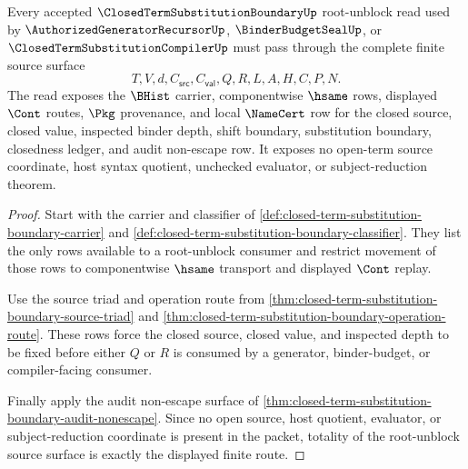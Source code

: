 \begin{theorem}
\label{thm:closed-term-substitution-boundary-source-totality}
Every accepted $\ClosedTermSubstitutionBoundaryUp$ root-unblock read used by $\AuthorizedGeneratorRecursorUp$, $\BinderBudgetSealUp$, or $\ClosedTermSubstitutionCompilerUp$ must pass through the complete finite source surface
$$
T,V,d,C_{\mathsf{src}},C_{\mathsf{val}},Q,R,L,A,H,C,P,N.
$$
The read exposes the $\BHist$ carrier, componentwise $\hsame$ rows, displayed $\Cont$ routes, $\Pkg$ provenance, and local $\NameCert$ row for the closed source, closed value, inspected binder depth, shift boundary, substitution boundary, closedness ledger, and audit non-escape row. It exposes no open-term source coordinate, host syntax quotient, unchecked evaluator, or subject-reduction theorem.
\end{theorem}
\begin{proof}
Start with the carrier and classifier of \autoref{def:closed-term-substitution-boundary-carrier} and \autoref{def:closed-term-substitution-boundary-classifier}. They list the only rows available to a root-unblock consumer and restrict movement of those rows to componentwise $\hsame$ transport and displayed $\Cont$ replay.

Use the source triad and operation route from \autoref{thm:closed-term-substitution-boundary-source-triad} and \autoref{thm:closed-term-substitution-boundary-operation-route}. These rows force the closed source, closed value, and inspected depth to be fixed before either $Q$ or $R$ is consumed by a generator, binder-budget, or compiler-facing consumer.

Finally apply the audit non-escape surface of \autoref{thm:closed-term-substitution-boundary-audit-nonescape}. Since no open source, host quotient, evaluator, or subject-reduction coordinate is present in the packet, totality of the root-unblock source surface is exactly the displayed finite route.
\end{proof}

